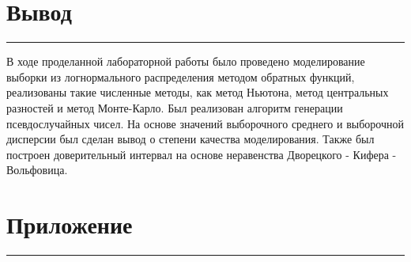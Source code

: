 \documentclass[a4paper, 14pt]{extarticle}
\begin{document}
\newpage

\section{Вывод}\vspace{-20pt}\rule{\linewidth}{0.1mm}

В ходе проделанной лабораторной работы было проведено моделирование выборки из 
логнормального распределения методом обратных функций, реализованы такие численные 
методы, как метод Ньютона, метод центральных разностей и метод Монте-Карло. Был реализован 
алгоритм генерации псевдослучайных чисел. На основе значений выборочного среднего и 
выборочной дисперсии был сделан вывод о степени качества моделирования. Также был 
построен доверительный интервал на основе неравенства Дворецкого - Кифера - Вольфовица.


\section{Приложение}\vspace{-20pt}\rule{\linewidth}{0.1mm}
\end{document}
